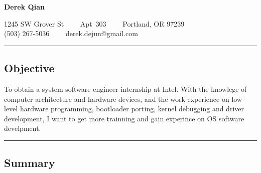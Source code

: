 \documentclass[10pt,letterpaper]{article}
\newenvironment{indentsection}[1]%
{\begin{list}{}%
	{\setlength{\leftmargin}{#1}}%
	\item[]%
}
{\end{list}}
\begin{document}
\begin{center}
{\LARGE \textbf{Derek Qian}}

1245 SW Grover St\ \ \textbullet
\ \ Apt\ 303\ \ \textbullet
\ \ Portland, OR 97239
\\
(503) 267-5036\ \ \textbullet
\ \ derek.dejun@gmail.com
\end{center}

\hrule
\vspace{-0.4em}
\subsection*{Objective}

\begin{indentsection}{\parindent}
To obtain a system software engineer internship at Intel. With the knowlege of computer architecture and hardware devices, and the work experience on low-level hardware programming, bootloader porting, kernel debugging and driver development, I want to get more trainning and gain experince on OS software develpment.
\end{indentsection}

\hrule
\vspace{-0.4em}
\subsection*{Summary}
\end{document}
